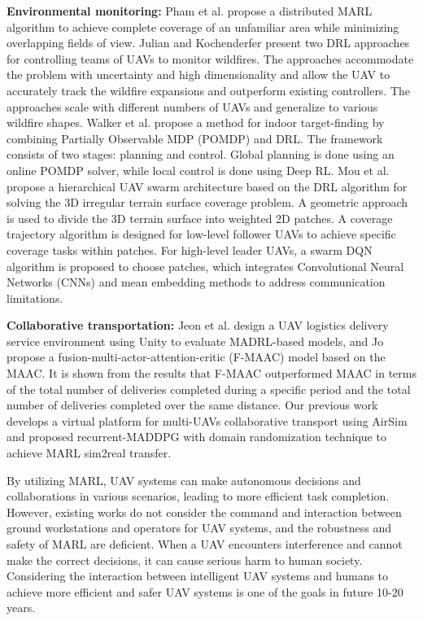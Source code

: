 \documentclass[acmsmall]{acmart}
\begin{document}
\textbf{Environmental monitoring:} Pham et al. \cite{journals/corr/abs-1803-07250} propose a distributed MARL algorithm to achieve complete coverage of an unfamiliar area while minimizing overlapping fields of view.  Julian and Kochenderfer \cite{julian2019distributed}
present two DRL approaches for controlling teams of UAVs to monitor wildfires. The approaches accommodate the problem with uncertainty and high dimensionality and allow the UAV to accurately track the wildfire expansions and outperform existing controllers. The approaches scale with different numbers of UAVs and generalize to various wildfire shapes.
Walker et al. \cite{9172262} propose a method for indoor target-finding by combining Partially Observable MDP (POMDP) and DRL. The framework consists of two stages: planning and control. Global planning is done using an online POMDP solver, while local control is done using Deep RL. Mou et al. \cite{9453825} propose a hierarchical UAV swarm architecture based on the DRL algorithm for solving the 3D irregular terrain surface coverage problem. A geometric approach is used to divide the 3D terrain surface into weighted 2D patches. A coverage trajectory algorithm is designed for low-level follower UAVs to achieve specific coverage tasks within patches. For high-level leader UAVs, a swarm DQN algorithm is proposed to choose patches, which integrates Convolutional Neural Networks (CNNs) and mean embedding methods to address communication limitations. 

\textbf{Collaborative transportation: } Jeon et al. \cite{10.1007/978-981-19-2635-8_71} design a UAV logistics delivery service environment using Unity to evaluate MADRL-based models, and Jo \cite{en15197426} propose a fusion-multi-actor-attention-critic (F-MAAC) model based on the MAAC. It is shown from the results that F-MAAC outperformed MAAC in terms of the total number of deliveries completed during a specific period and the total number of deliveries completed over the same distance.
Our previous work \cite{9993797} develops a virtual platform for multi-UAVs collaborative transport using AirSim \cite{10.1007/978-3-319-67361-5_40} and proposed recurrent-MADDPG with domain randomization technique to achieve MARL sim2real transfer.

By utilizing MARL, UAV systems can make autonomous decisions and collaborations in various scenarios, leading to more efficient task completion. However, existing works do not consider the command and interaction between ground workstations and operators for UAV systems, and the robustness and safety of MARL are deficient. When a UAV encounters interference and cannot make the correct decisions, it can cause serious harm to human society. Considering the interaction between intelligent UAV systems and humans to achieve more efficient and safer UAV systems is one of the goals in future 10-20 years.
\end{document}
